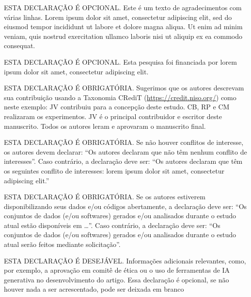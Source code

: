 \documentclass[spanish]{sbc2025}%
\begin{document}
\begin{declarations}

\begin{acknowledgements}
ESTA DECLARAÇÃO É OPCIONAL. Este é um texto de agradecimentos com várias linhas. Lorem ipsum dolor sit amet, consectetur adipiscing elit, sed do eiusmod tempor incididunt ut labore et dolore magna aliqua. Ut enim ad minim veniam, quis nostrud exercitation ullamco laboris nisi ut aliquip ex ea commodo consequat.
\end{acknowledgements}

\begin{funding}
ESTA DECLARAÇÃO É OPCIONAL. Esta pesquisa foi financiada por lorem ipsum dolor sit amet, consectetur adipiscing elit.
\end{funding}

\begin{contributions}
ESTA DECLARAÇÃO É OBRIGATÓRIA. Sugerimos que os autores descrevam sua contribuição usando a Taxonomia CRediT (\href{https://credit.niso.org/}{https://credit.niso.org/}) como neste exemplo: JV contribuiu para a concepção deste estudo. CB, RP e CM realizaram os experimentos. JV é o principal contribuidor e escritor deste manuscrito. Todos os autores leram e aprovaram o manuscrito final. 
\end{contributions}

\begin{interests}
ESTA DECLARAÇÃO É OBRIGATÓRIA. Se não houver conflitos de interesse, os autores devem declarar: ``Os autores declaram que não têm nenhum conflito de interesses''. Caso contrário, a declaração deve ser: ``Os autores declaram que têm os seguintes conflito de interesses: lorem ipsum dolor sit amet, consectetur adipiscing elit.''
\end{interests}

\begin{materials}
ESTA DECLARAÇÃO É OBRIGATÓRIA. 
  Se os autores estiverem disponibilizando seus dados e/ou códigos
  abertamente, a declaração deve ser: ``Os conjuntos de dados (e/ou
  softwares) gerados e/ou analisados durante o estudo atual estão
  disponíveis em \ldots''. Caso contrário, a declaração deve ser: ``Os
  conjuntos de dados (e/ou softwares) gerados e/ou analisados durante
  o estudo atual serão feitos mediante solicitação''.
\end{materials}

\begin{furtherinformation}
ESTA DECLARAÇÃO É DESEJÁVEL. Informações adicionais relevantes, como, por exemplo, a aprovação em comitê de ética ou o uso de ferramentas de IA generativa no desenvolvimento do artigo. Essa declaração é opcional, se não houver nada a ser acrescentado, pode ser deixada em branco
\end{furtherinformation}
\end{declarations}





\end{document}
